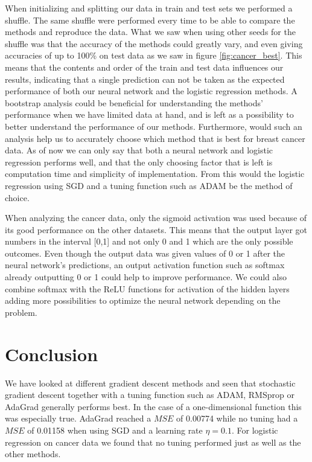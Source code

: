 \documentclass[11pt]{article}
\begin{document}
When initializing and splitting our data in train and test sets we performed a shuffle. The same shuffle were performed every time to be able to compare the methods and reproduce the data. What we saw when using other seeds for the shuffle was that the accuracy of the methods could greatly vary, and even giving accuracies of up to 100\% on test data as we saw in figure \ref{fig:cancer_best}. This means that the contents and order of the train and test data influences our results, indicating that a single prediction can not be taken as the expected performance of both our neural network and the logistic regression methods. A bootstrap analysis could be beneficial for understanding the methods' performance when we have limited data at hand, and is left as a possibility to better understand the performance of our methods. Furthermore, would such an analysis help us to accurately choose which method that is best for breast cancer data. As of now we can only say that both a neural network and logistic regression performs well, and that the only choosing factor that is left is computation time and simplicity of implementation. From this would the logistic regression using SGD and a tuning function such as ADAM be the method of choice.

When analyzing the cancer data, only the sigmoid activation was used because of its good performance on the other datasets. This means that the output layer got numbers in the interval [0,1] and not only 0 and 1 which are the only possible outcomes. Even though the output data was given values of 0 or 1 after the neural network's predictions, an output activation  function such as softmax already outputting 0 or 1 could help to improve performance. We could also combine softmax with the ReLU functions for activation of the hidden layers adding more possibilities to optimize the neural network depending on the problem.

\section{Conclusion}
We have looked at different gradient descent methods and seen that stochastic gradient descent together with a tuning function such as ADAM, RMSprop or AdaGrad generally performs best. In the case of a one-dimensional function this was especially true. AdaGrad reached a $MSE$ of 0.00774 while no tuning had a $MSE$ of 0.01158 when using SGD and a learning rate $\eta=0.1$. For logistic regression on cancer data we found that no tuning performed just as well as the other methods.
\end{document}
